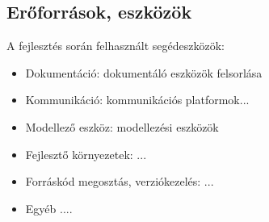 \subsection{Erőforrások, eszközök}
A fejlesztés során felhasznált segédeszközök:
\begin{itemize}
	\item Dokumentáció: dokumentáló eszközök felsorlása
	\item Kommunikáció: kommunikációs platformok...
	\item Modellező eszköz: modellezési eszközök
	\item Fejlesztő környezetek: ...
	\item Forráskód megosztás, verziókezelés: ...
	\item Egyéb ....
\end{itemize}


